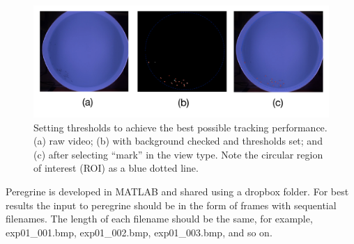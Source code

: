 \documentclass[12pt]{article}
\begin{document}
\begin{figure}[ht]
\centering
\includegraphics[width=.995\linewidth]{thresholds}
\caption{Setting thresholds to achieve the best possible tracking performance. (a) raw video; (b) with background checked and thresholds set; and (c) after selecting ``mark'' in the view type. Note the circular region of interest (ROI) as a blue dotted line.}
\label{fig:thresholds}
\end{figure}
Peregrine is developed in MATLAB and shared using a dropbox folder. For best results the input to peregrine should be in the form of frames with sequential filenames. The length of each filename should be the same, for example, exp01\_001.bmp, exp01\_002.bmp, exp01\_003.bmp, and so on. 
\end{document}
